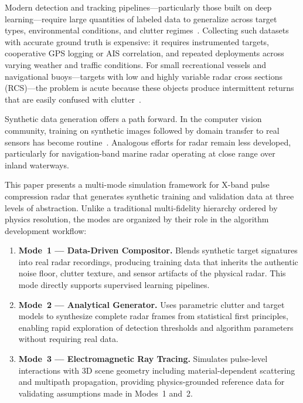 \documentclass[twocolumn, 10pt]{article}
\begin{document}
Modern detection and tracking pipelines---particularly those built on deep learning---require large quantities of labeled data to generalize across target types, environmental conditions, and clutter regimes~\cite{nikolenko2021synthetic}. Collecting such datasets with accurate ground truth is expensive: it requires instrumented targets, cooperative GPS logging or AIS correlation, and repeated deployments across varying weather and traffic conditions. For small recreational vessels and navigational buoys---targets with low and highly variable radar cross sections (RCS)---the problem is acute because these objects produce intermittent returns that are easily confused with clutter~\cite{ward2013sea, swerling1960probability}.

Synthetic data generation offers a path forward. In the computer vision community, training on synthetic images followed by domain transfer to real sensors has become routine~\cite{tobin2017domain, tremblay2018training}. Analogous efforts for radar remain less developed, particularly for navigation-band marine radar operating at close range over inland waterways.

This paper presents a multi-mode simulation framework for X-band pulse compression radar that generates synthetic training and validation data at three levels of abstraction. Unlike a traditional multi-fidelity hierarchy ordered by physics resolution, the modes are organized by their role in the algorithm development workflow:

\begin{enumerate}
    \item \textbf{Mode~1 --- Data-Driven Compositor.} Blends synthetic target signatures into real radar recordings, producing training data that inherits the authentic noise floor, clutter texture, and sensor artifacts of the physical radar. This mode directly supports supervised learning pipelines.
    \item \textbf{Mode~2 --- Analytical Generator.} Uses parametric clutter and target models to synthesize complete radar frames from statistical first principles, enabling rapid exploration of detection thresholds and algorithm parameters without requiring real data.
    \item \textbf{Mode~3 --- Electromagnetic Ray Tracing.} Simulates pulse-level interactions with 3D scene geometry including material-dependent scattering and multipath propagation, providing physics-grounded reference data for validating assumptions made in Modes~1 and~2.
\end{enumerate}
\end{document}

